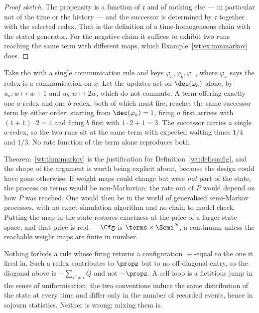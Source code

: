 \begin{proof}[Proof sketch]
The propensity is a function of $\mathfrak{c}$ and of nothing else --- in particular not
of the time or the history --- and the successor is determined by $\mathfrak{c}$ together
with the selected redex. That is the definition of a time-homogeneous chain with the
stated generator. For the negative claim it suffices to exhibit two runs reaching the same
term with different maps, which Example~\ref{wt:ex:nonmarkov} does.
\end{proof}

\begin{example}
\label{wt:ex:nonmarkov}
Take rho with a single communication rule and keys $\varphi_a, \varphi_b, \varphi_{\bot}$,
where $\varphi_x$ says the redex is a communication on $x$. Let the updates act on
$\dec(\varphi_a)$ alone, by $u_a : w \mapsto w+1$ and $u_b : w \mapsto 2w$, which do not
commute. A term offering exactly one $a$-redex and one $b$-redex, both of which must fire,
reaches the same successor term by either order; starting from $\dec(\varphi_a) = 1$,
firing $a$ first arrives with $(1+1)\cdot 2 = 4$ and firing $b$ first with
$1\cdot 2 + 1 = 3$. The successor carries a single $a$-redex, so the two runs sit at the
same term with expected waiting times $1/4$ and $1/3$. No rate function of the term alone
reproduces both.
\end{example}

Theorem~\ref{wt:thm:markov} is the justification for
Definition~\ref{wt:def:config}, and the shape of the argument is worth being explicit
about, because the design could have gone otherwise. If weight maps could change but were
\emph{not} part of the state, the process on terms would be non-Markovian: the rate out of
$P$ would depend on how $P$ was reached. One would then be in the world of generalised
semi-Markov processes, with no exact simulation algorithm and no chain to model check.
Putting the map in the state restores exactness at the price of a larger state space, and
that price is real --- $\Cfg$ is $\terms \times \Semi^N$, a continuum unless the reachable
weight maps are finite in number.

\begin{remark}
\label{wt:rmk:selfloop}
Nothing forbids a rule whose firing returns a configuration $\equiv$-equal to the one it
fired in. Such a redex contributes to $\propz$ but to no off-diagonal entry, so the
diagonal above is $-\sum_{\mathfrak{c}' \neq \mathfrak{c}} Q$ and not $-\propz$. A
self-loop is a fictitious jump in the sense of uniformisation: the two conventions induce
the same distribution of the state at every time and differ only in the number of recorded
events, hence in sojourn statistics. Neither is wrong; mixing them is.
\end{remark}

